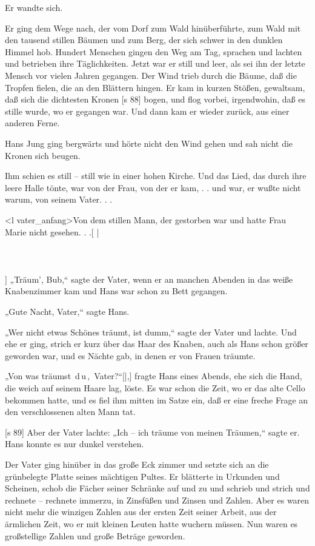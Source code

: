 Er wandte sich.

Er ging dem Wege nach, der vom Dorf zum
Wald hinüberführte, zum Wald mit den tausend
stillen Bäumen und zum Berg, der sich schwer in den
dunklen Himmel hob. Hundert Menschen gingen den
Weg am Tag, sprachen und lachten und betrieben
ihre Täglichkeiten. Jetzt war er still und leer, als sei
ihn der letzte Mensch vor vielen Jahren gegangen.
Der Wind trieb durch die Bäume, daß die Tropfen
fielen, die an den Blättern hingen. Er kam in kurzen
Stößen, gewaltsam, daß sich die dichtesten Kronen
[s 88]
bogen, und flog vorbei, irgendwohin, daß es stille
wurde, wo er gegangen war. Und dann kam er
wieder zurück, aus einer anderen Ferne.

Hans Jung ging bergwärts und hörte nicht den
Wind gehen und sah nicht die Kronen sich beugen.

Ihm schien es still – still wie in einer hohen
Kirche. Und das Lied, das durch ihre leere Halle
tönte, war von der Frau, von der er kam, . . und
war, er wußte nicht warum, von seinem Vater. . .

<l vater_anfang>Von dem stillen Mann, der gestorben war und
hatte Frau Marie nicht gesehen. . .[
|
\\
\\
\\
\\]
„Träum', Bub,“ sagte der Vater, wenn er an
manchen Abenden in das weiße Knabenzimmer kam
und Hans war schon zu Bett gegangen.

„Gute Nacht, Vater,“ sagte Hans.

„Wer nicht etwas Schönes träumt, ist dumm,“
sagte der Vater und lachte. Und ehe er ging, strich
er kurz über das Haar des Knaben, auch als Hans
schon größer geworden war, und es Nächte gab, in
denen er von Frauen träumte.

„Von was träumst  d u ,  Vater?“[|,] fragte Hans
eines Abends, ehe sich die Hand, die weich auf
seinem Haare lag, löste. Es war schon die Zeit,
wo er das alte Cello bekommen hatte, und es fiel
ihm mitten im Satze ein, daß er eine freche Frage
an den verschlossenen alten Mann tat.

[s 89]
Aber der Vater lachte: „Ich – ich träume von
meinen Träumen,“ sagte er. Hans konnte es nur
dunkel verstehen.

Der Vater ging hinüber in das große Eck­
zimmer und setzte sich an die grünbelegte Platte
seines mächtigen Pultes. Er blätterte in Urkunden
und Scheinen, schob die Fächer seiner Schränke auf
und zu und schrieb und strich und rechnete – rechnete
immerzu, in Zinsfüßen und Zinsen und Zahlen.
Aber es waren nicht mehr die winzigen Zahlen aus
der ersten Zeit seiner Arbeit, aus der ärmlichen Zeit,
wo er mit kleinen Leuten hatte wuchern müssen.
Nun waren es großstellige Zahlen und große Beträge
geworden.

